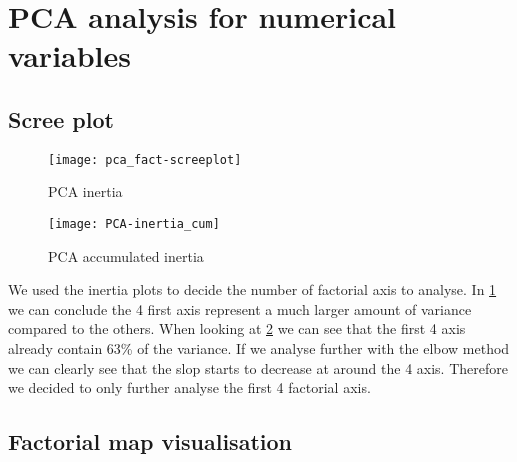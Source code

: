 

\section{PCA analysis for numerical variables}%
\label{sec:pca_analysis_for_numerical_variables}

\subsection{Scree plot}%
\label{sub:scree_plot}


\begin{figure}[H]
    \centering
    \texttt{[image: pca\_fact-screeplot]} %
    \caption{PCA inertia}%
    \label{fig:pca_inertia}
\end{figure}

\begin{figure}[H]
    \centering
    \texttt{[image: PCA-inertia\_cum]}
    \caption{PCA accumulated inertia}%
    \label{fig:pca_inertia_cum}
\end{figure}

\vspace{-1em}
We used the inertia plots to decide the number of factorial axis to analyse. In
\cref{fig:pca_inertia} we can conclude the 4 first axis represent a much
larger amount of variance compared to the others. When looking at
\cref{fig:pca_inertia_cum} we can see that the first 4 axis already contain 63\%
of the variance. If we analyse further with the elbow method we can clearly see
that the slop starts to decrease at around the 4 axis. Therefore we decided to
only further analyse the first 4 factorial axis.



\subsection{Factorial map visualisation}%
\label{sub:factorial_map_visualisation}

\newcommand{\factorialmap}[2]{
    \begin{figure}[H]
        \centering
        \texttt{[image: pca\_fact-plane\_\#1\_\#2-var]}
        \caption{PCA plane #1 vs #2}%
        \label{fig:plane_#1-#2}
    \end{figure}
}

